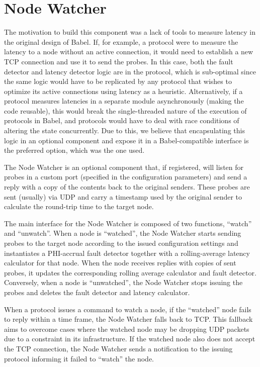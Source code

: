 \section{Node Watcher} \label{sec:Node-Watcher}

The motivation to build this component was a lack of tools to measure latency in the original design of Babel. If, for example, a protocol were to measure the latency to a node without an active connection, it would need to establish a new TCP connection and use it to send the probes. In this case, both the fault detector and latency detector logic are in the protocol, which is sub-optimal since the same logic would have to be replicated by any protocol that wishes to optimize its active connections using latency as a heuristic. Alternatively, if a protocol measures latencies in a separate module asynchronously (making the code reusable), this would break the single-threaded nature of the execution of protocols in Babel, and protocols would have to deal with race conditions of altering the state concurrently. Due to this, we believe that encapsulating this logic in an optional component and expose it in a Babel-compatible interface is the preferred option, which was the one used.

The Node Watcher is an optional component that, if registered, will listen for probes in a custom port (specified in the configuration parameters) and send a reply with a copy of the contents back to the original senders. These probes are sent (usually) via UDP and carry a timestamp used by the original sender to calculate the round-trip time to the target node.

The main interface for the Node Watcher is composed of two functions, ``watch'' and ``unwatch''. When a node is ``watched'', the Node Watcher starts sending probes to the target node according to the issued configuration settings and instantiates a PHI-accrual fault detector  together with a rolling-average latency calculator for that node.  When the node receives replies with copies of sent probes, it updates the corresponding rolling average calculator and fault detector. Conversely, when a node is ``unwatched'', the Node Watcher stops issuing the probes and deletes the fault detector and latency calculator.

When a protocol issues a command to watch a node, if the ``watched'' node fails to reply within a time frame, the Node Watcher falls back to TCP. This fallback aims to overcome cases where the watched node may be dropping UDP packets due to a constraint in its infrastructure. If the watched node also does not accept the TCP connection, the Node Watcher sends a notification to the issuing protocol informing it failed to ``watch'' the node.

